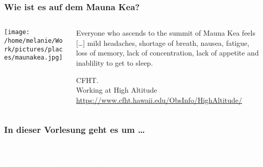 \documentclass{beamer}
\begin{document}
\begin{frame}
\frametitle{Wie ist es auf dem Mauna Kea?}

\begin{columns}[c]

\begin{column}{5cm}

\begin{center}

\texttt{[image: /home/melanie/Work/pictures/places/maunakea.jpg]}

\end{center}

\end{column}

\begin{column}{5cm}

  \epigraph{Everyone who ascends to the summit of Mauna Kea feels [\dots] mild headaches, shortage of breath, nausea, fatigue, loss of memory, lack of concentration, lack of appetite and inablility to get to sleep.}{CFHT.\\ Working at High Altitude \\ \url{https://www.cfht.hawaii.edu/ObsInfo/HighAltitude/}}

\end{column}

\end{columns}

\end{frame}
 




{

\begin{frame}[plain]

\frametitle{In dieser Vorlesung geht es um \dots}

\textcolor{white}{Bewegung von Flüssigkeiten und Gasen \\ und damit einhergehende Kräfte}

\vfill

 
\end{frame}
}


 
\end{document}
